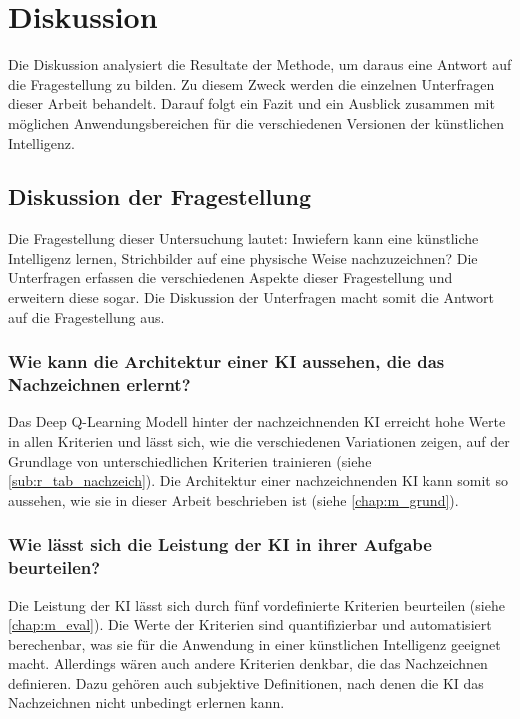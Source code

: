 \chapter{Diskussion}\label{chap:d} 
Die Diskussion analysiert die Resultate der Methode, um daraus eine Antwort auf
die Fragestellung zu bilden. Zu diesem Zweck werden die einzelnen Unterfragen
dieser Arbeit behandelt. Darauf folgt ein Fazit und ein Ausblick zusammen mit
möglichen Anwendungsbereichen für die verschiedenen Versionen der künstlichen
Intelligenz.

\section{Diskussion der Fragestellung}\label{chap:d_frage} 
Die Fragestellung dieser Untersuchung lautet: Inwiefern kann eine künstliche
Intelligenz lernen, Strichbilder auf eine physische Weise nachzuzeichnen? Die
Unterfragen erfassen die verschiedenen Aspekte dieser Fragestellung und
erweitern diese sogar. Die Diskussion der Unterfragen macht somit die Antwort
auf die Fragestellung aus.

\subsection{Wie kann die Architektur einer KI aussehen, die das Nachzeichnen
erlernt?}\label{subsub:d_frage_unter_1} Das Deep Q-Learning Modell hinter der
nachzeichnenden KI erreicht hohe Werte in allen Kriterien und lässt sich, wie
die verschiedenen Variationen zeigen, auf der Grundlage von unterschiedlichen
Kriterien trainieren (siehe \ref{sub:r_tab_nachzeich}). Die Architektur
einer nachzeichnenden KI kann somit so aussehen, wie sie in dieser Arbeit
beschrieben ist (siehe \ref{chap:m_grund}).


\subsection{Wie lässt sich die Leistung der KI in ihrer Aufgabe
beurteilen?}\label{subsub:d_frage_unter_2} Die Leistung der KI lässt sich durch
fünf vordefinierte Kriterien beurteilen (siehe \ref{chap:m_eval}). Die
Werte der Kriterien sind quantifizierbar und automatisiert berechenbar, was sie
für die Anwendung in einer künstlichen Intelligenz geeignet macht. Allerdings
wären auch andere Kriterien denkbar, die das Nachzeichnen definieren. Dazu
gehören auch subjektive Definitionen, nach denen die KI das Nachzeichnen nicht
unbedingt erlernen kann. 

